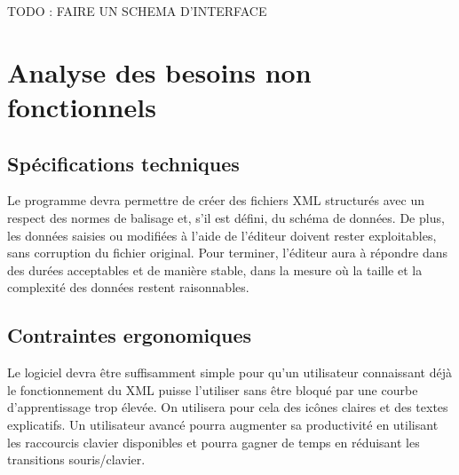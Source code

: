 	TODO : FAIRE UN SCHEMA D'INTERFACE
	
	\section{Analyse des besoins non fonctionnels}
		\subsection{Spécifications techniques}
		Le programme devra permettre de créer des fichiers XML structurés avec un respect des normes de balisage et, s'il est défini, du schéma de données. De plus, les données saisies ou modifiées à l'aide de l'éditeur doivent rester exploitables, sans corruption du fichier original. Pour terminer, l'éditeur aura à répondre dans des durées acceptables et de manière stable, dans la mesure où la taille et la complexité des données restent raisonnables.
		
		\subsection{Contraintes ergonomiques}
                Le logiciel devra être suffisamment simple pour qu'un utilisateur connaissant déjà le fonctionnement du XML puisse l'utiliser sans être bloqué par une courbe d'apprentissage trop élevée. On utilisera pour cela des icônes claires et des textes explicatifs.
                Un utilisateur avancé pourra augmenter sa productivité en utilisant les raccourcis clavier disponibles et pourra gagner de temps en réduisant les transitions souris/clavier.

